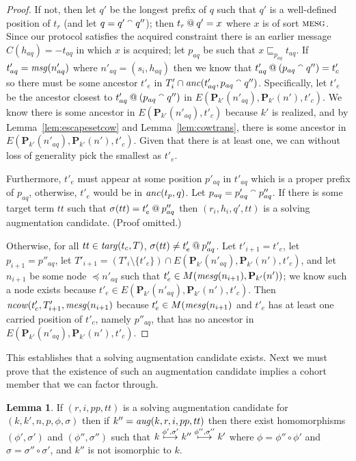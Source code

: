 \documentclass[12pt]{article}
\theoremstyle{definition}
\newtheorem{lem}{Lemma}[section]
\newcommand{\scap}[1]{\ensuremath{\mathop{\relax
                    \smash{\mbox{\sc#1}}}\!\mathop{\vphantom{#1}}\nolimits}}
\newcommand{\pubmsg}{\mathbf{P}}
\newcommand{\aug}{\fn{aug}}
\newcommand{\anc}{\fn{anc}}
\newcommand{\mncow}{\fn{ncow}}
\newcommand{\msg}{\fn{msg}}
\begin{document}
\begin{proof}
If not, then let $q'$ be the longest prefix of $q$ such that $q'$ is a well-defined position of $t_r$ (and let $q = q' \mathbin{{}^\smallfrown}
q''$); then $t_r \mathbin{@} q' = x$ where $x$ is of sort $\scap{mesg}$.  Since our protocol satisfies the acquired constraint
there is an earlier message $C(h_{aq}) = -t_{aq}$ in which $x$ is acquired; let $p_{aq}$ be such that $x \sqsubseteq_{p_{aq}}
t_{aq}$.  If $t'_{aq} = \msg(n'_{aq})$ where $n'_{aq} = (s_i, h_{aq})$ then we know that $t'_{aq} \mathbin{@} (p_{aq} \mathbin{{}^\smallfrown}
q'') = t'_c$ so there must be some ancestor $t'_e$ in $T'_i \cap \anc(t'_{aq},p_{aq}\append q'')$.  Specifically, let $t'_e$
be the ancestor closest to $t'_{aq} \mathbin{@} (p_{aq} \mathbin{{}^\smallfrown} q'')$ in $E(\pubmsg_{k'}(n'_{aq}),
\pubmsg_{k'}(n'),t'_c)$.  We know there is some ancestor in $E(\pubmsg_{k'}(n'_{aq}),t'_c)$ because $k'$ is realized, and
by Lemma~\ref{lem:escapesetcow} and Lemma~\ref{lem:cowtrans}, there is some ancestor in $E(\pubmsg_{k'}(n'_{aq}), \pubmsg_{k'}(n'),
t'_c)$.  Given that there is at least one, we can without loss of generality pick the smallest as $t'_e$.

Furthermore, $t'_e$ must appear at some position $p'_{aq}$ in $t'_{aq}$ which is a proper prefix of $p_{aq}$, otherwise, $t'_e$ would
be in $\anc(t_p,q)$.  Let $p_{aq} = p'_{aq} \mathbin{{}^\smallfrown} p''_{aq}$.  If there is some target term $tt$ such that $\sigma(tt) = t'_e \mathbin{@} p''_{aq}$
then $(r_i,h_i,q',tt)$ is a solving augmentation candidate.  (Proof omitted.)

Otherwise, for all $tt \in \operatorname{\mathit{targ}}(t_c,T)$, $\sigma(tt) \neq t'_e \mathbin{@} p''_{aq}$.  Let $t'_{i+1} = t'_e$, let $p_{i+1} = p''_{aq}$, let
$T'_{i+1} = (T'_i \setminus \{t'_e\}) \cap E(\pubmsg_{k'}(n'_{aq}),\pubmsg_{k'}(n'),t'_c)$,
and let $n_{i+1}$ be some node $\preceq n'_{aq}$ such that $t'_e \in M(\fn{mesg}(n_{i+1}),\pubmsg_{k'}(n'))$; we know such a node
exists because $t'_e \in E(\pubmsg_{k'}(n'_{aq}),\pubmsg_{k'}(n'),t'_c)$.  Then $\mncow(t'_c, T'_{i+1}, \fn{mesg}(n_{i+1})$ because
$t'_e \in M(\operatorname{\mathit{mesg}}(n_{i+1})$ and $t'_e$ has at least one carried position of $t'_c$, namely $p''_{aq}$, that has no ancestor
in $E(\pubmsg_{k'}(n'_{aq}),\pubmsg_{k'}(n'),t'_c)$.
\end{proof}

This establishes that a solving augmentation candidate exists.  Next we must prove that the existence of such an
augmentation candidate implies a cohort member that we can factor through.

\begin{lem}
\label{lem:candidate works}
If $(r,i,pp,tt)$ is a solving augmentation candidate for $(k,k',n,p,\phi,\sigma)$ then if
$k'' = \aug(k,r,i,pp,tt)$ then there exist homomorphisms $(\phi', \sigma')$ and $(\phi'',\sigma'')$
such that $k \stackrel{\phi',\sigma'}{\longmapsto} k'' \stackrel{\phi'',\sigma''}{\longmapsto} k'$ where $\phi = \phi''
\circ \phi'$ and $\sigma = \sigma'' \circ \sigma'$, and $k''$ is not isomorphic to $k$.
\end{lem}
\end{document}
